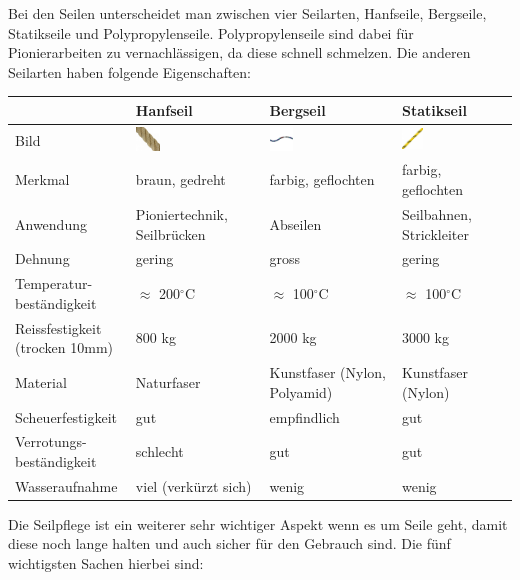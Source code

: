 Bei den Seilen unterscheidet man zwischen vier Seilarten, Hanfseile, Bergseile, Statikseile und Polypropylenseile. Polypropylenseile sind dabei für Pionierarbeiten zu vernachlässigen, da diese schnell schmelzen. Die anderen Seilarten haben folgende Eigenschaften:
\begin{center}
\begin{tabularx}{\textwidth}{p{}|X|X|X}
     & \textbf{Hanfseil} & \textbf{Bergseil} & \textbf{Statikseil} \\ \hline
     Bild & \includegraphics[width=0.2\textwidth]{Picture/hanfseil.png} & \includegraphics[width=0.2\textwidth]{Picture/bergseil.png} & \includegraphics[width=0.2\textwidth]{Picture/statikseil.png} \\\hline
     Merkmal & braun, gedreht & farbig, geflochten & farbig, geflochten \\\hline
     Anwendung & Pioniertechnik, Seilbrücken & Abseilen & Seilbahnen, Strickleiter \\\hline
     Dehnung & gering & gross & gering \\\hline
     Temperatur- beständigkeit & $\approx$ 200$^\circ$C & $\approx$ 100$^\circ$C & $\approx$ 100$^\circ$C \\\hline
     Reissfestigkeit (trocken 10mm) & 800 kg & 2000 kg & 3000 kg \\\hline
     Material & Naturfaser & Kunstfaser (Nylon, Polyamid) & Kunstfaser (Nylon) \\\hline
     Scheuerfestigkeit & gut & empfindlich & gut \\\hline
     Verrotungs- beständigkeit & schlecht & gut & gut \\\hline
     Wasseraufnahme & viel (verkürzt sich) & wenig & wenig \\
\end{tabularx}
\end{center}
Die Seilpflege ist ein weiterer sehr wichtiger Aspekt wenn es um Seile geht, damit diese noch lange halten und auch sicher für den Gebrauch sind. Die fünf wichtigsten Sachen hierbei sind:

